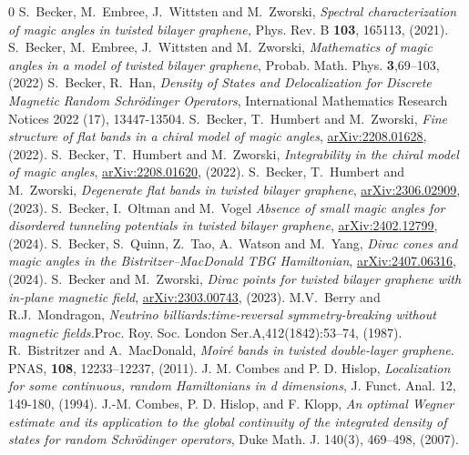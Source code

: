 \documentclass[reqno,12pt,letterpaper]{amsart}
\def\arXiv#1{\href{http://arxiv.org/abs/#1}{arXiv:#1}}
\numberwithin{equation}{section}
\begin{document}
\begin{thebibliography}{0}
 S.~Becker, M.~Embree, J.~Wittsten and M.~Zworski,
{\em Spectral characterization of magic angles in twisted bilayer graphene,} Phys. Rev. B {\bf 103}, 165113, (2021).
  S.~Becker, M.~Embree, J.~Wittsten and M.~Zworski,
{\em Mathematics of magic angles in a model of twisted bilayer graphene},
 Probab. Math. Phys. {\bf 3},69--103, (2022) 
  S.~Becker, R.~Han, {\em Density of States and Delocalization for Discrete Magnetic Random Schrödinger Operators},
International Mathematics Research Notices 2022 (17), 13447-13504.
 S.~Becker, T.~Humbert and M.~Zworski,
{\em Fine structure of flat bands in a chiral model of magic angles}, \arXiv{2208.01628}, (2022).
 S.~Becker, T.~Humbert and M.~Zworski,
{\em Integrability in the chiral model of magic angles}, \arXiv{2208.01620}, (2022).
 S.~Becker, T.~Humbert and M.~Zworski,
{\em Degenerate flat bands in twisted bilayer graphene}, \arXiv{2306.02909}, (2023).
 S.~Becker, I.~Oltman and M.~Vogel \emph{Absence of small magic angles for disordered tunneling potentials in twisted bilayer graphene}, \arXiv{2402.12799},(2024).
 S.~Becker, S.~Quinn, Z.~Tao, A.~Watson and M.~Yang, \emph{Dirac cones and magic angles in the Bistritzer--MacDonald TBG Hamiltonian}, \arXiv{2407.06316}, (2024). 
 S.~Becker and M.~Zworski,
{\em Dirac points for twisted bilayer graphene with in-plane magnetic field}, \arXiv{2303.00743}, (2023). 
 M.V.~Berry and R.J.~Mondragon, \emph{Neutrino billiards:time-reversal symmetry-breaking without magnetic fields.}Proc. Roy. Soc. London Ser.A,412(1842):53–74, (1987).
 R.~Bistritzer and A.~MacDonald, {\em Moir\'e bands in twisted double-layer graphene}. PNAS, {\bf 108}, 12233--12237, (2011).
 J. M. Combes and P. D. Hislop, \emph{Localization for some continuous, random Hamiltonians in d dimensions}, J. Funct. Anal. 12, 149-180, (1994).
 J.-M. Combes, P. D. Hislop, and F. Klopp, \emph{ An optimal Wegner estimate and its application to the global continuity of the integrated density of states for random Schrödinger operators}, Duke Math. J. 140(3), 469–498, (2007).

\end{thebibliography}
\end{document}

